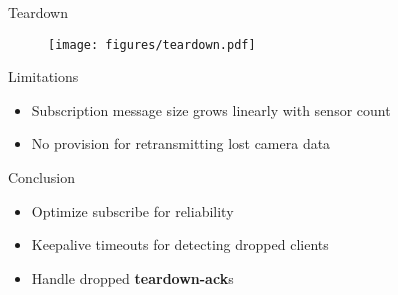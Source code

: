 \documentclass{beamer}
\begin{document}
\begin{frame}{Teardown}
\begin{figure}
	\texttt{[image: figures/teardown.pdf]}
\end{figure}
\end{frame}

\begin{frame}{Limitations}
\begin{itemize}
	\item Subscription message size grows linearly with sensor count
    \item No provision for retransmitting lost camera data
\end{itemize}
\end{frame}

\begin{frame}{Conclusion}
\begin{itemize}
	\item Optimize subscribe for reliability
    \item Keepalive timeouts for detecting dropped clients
    \item Handle dropped \textbf{teardown-ack}s
\end{itemize}
\end{frame}
\end{document}
